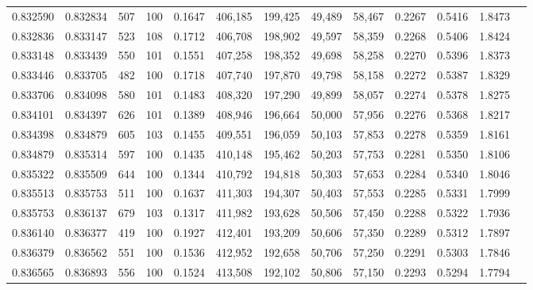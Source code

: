 \begin{tabular}{rrrrrrrrrrrrr}
0.832590 & 0.832834 &   507 & 100 &                                     0.1647 & 406,185 & 199,425 &  49,489 &  58,467 & 0.2267 & 0.5416 & 1.8473 \\
0.832836 & 0.833147 &   523 & 108 &                                     0.1712 & 406,708 & 198,902 &  49,597 &  58,359 & 0.2268 & 0.5406 & 1.8424 \\
0.833148 & 0.833439 &   550 & 101 &                                     0.1551 & 407,258 & 198,352 &  49,698 &  58,258 & 0.2270 & 0.5396 & 1.8373 \\
0.833446 & 0.833705 &   482 & 100 &                                     0.1718 & 407,740 & 197,870 &  49,798 &  58,158 & 0.2272 & 0.5387 & 1.8329 \\
0.833706 & 0.834098 &   580 & 101 &                                     0.1483 & 408,320 & 197,290 &  49,899 &  58,057 & 0.2274 & 0.5378 & 1.8275 \\
0.834101 & 0.834397 &   626 & 101 &                                     0.1389 & 408,946 & 196,664 &  50,000 &  57,956 & 0.2276 & 0.5368 & 1.8217 \\
0.834398 & 0.834879 &   605 & 103 &                                     0.1455 & 409,551 & 196,059 &  50,103 &  57,853 & 0.2278 & 0.5359 & 1.8161 \\
0.834879 & 0.835314 &   597 & 100 &                                     0.1435 & 410,148 & 195,462 &  50,203 &  57,753 & 0.2281 & 0.5350 & 1.8106 \\
0.835322 & 0.835509 &   644 & 100 &                                     0.1344 & 410,792 & 194,818 &  50,303 &  57,653 & 0.2284 & 0.5340 & 1.8046 \\
0.835513 & 0.835753 &   511 & 100 &                                     0.1637 & 411,303 & 194,307 &  50,403 &  57,553 & 0.2285 & 0.5331 & 1.7999 \\
0.835753 & 0.836137 &   679 & 103 &                                     0.1317 & 411,982 & 193,628 &  50,506 &  57,450 & 0.2288 & 0.5322 & 1.7936 \\
0.836140 & 0.836377 &   419 & 100 &                                     0.1927 & 412,401 & 193,209 &  50,606 &  57,350 & 0.2289 & 0.5312 & 1.7897 \\
0.836379 & 0.836562 &   551 & 100 &                                     0.1536 & 412,952 & 192,658 &  50,706 &  57,250 & 0.2291 & 0.5303 & 1.7846 \\
0.836565 & 0.836893 &   556 & 100 &                                     0.1524 & 413,508 & 192,102 &  50,806 &  57,150 & 0.2293 & 0.5294 & 1.7794 \\

\end{tabular}
